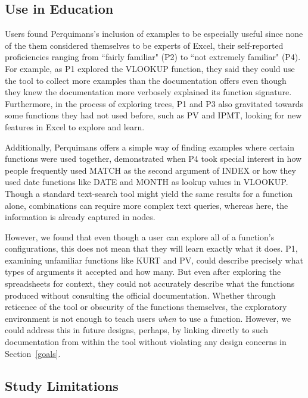 \documentclass[conference]{IEEEtran}
\newcommand{\toolname}{Perquimans\xspace} \newcommand{\toolnameend}{Perquimans}
\begin{document}
	\subsection{Use in Education} Users found \toolname's inclusion of examples to
	be especially useful since none of the them considered themselves to be experts
	of Excel, their self-reported proficiencies ranging from ``fairly familiar"
	(P2) to ``not extremely familiar" (P4). For example, as P1 explored the VLOOKUP
	function, they said they could use the tool to collect more examples than the
	documentation offers even though they knew the documentation more verbosely
	explained its function signature. Furthermore, in the process of exploring
	trees, P1 and P3 also gravitated towards some functions they had not used
	before, such as PV and IPMT, looking for new features in Excel to explore and
	learn. \par
	
	Additionally, \toolname offers a simple way of finding examples where certain
	functions were used together, demonstrated when P4 took special interest in how
	people frequently used MATCH as the second argument of INDEX or how they used
	date functions like DATE and MONTH as lookup values in VLOOKUP. Though a
	standard text-search tool might yield the same results for a function alone,
	combinations can require more complex text queries, whereas here, the
	information is already captured in nodes.  \par
	
	However, we found that even though a user can explore all of a function's
	configurations, this does not mean that they will learn exactly what it does.
	P1, examining unfamiliar functions like KURT and PV, could describe precisely
	what types of arguments it accepted and how many. But even after exploring the
	spreadsheets for context, they could not accurately describe what the functions
	produced without consulting the official documentation. Whether through
	reticence of the tool or obscurity of the functions themselves, the exploratory
	environment is not enough to teach users \textit{when} to use a function.
	However, we could address this in future designs, perhaps, by linking directly
	to such documentation from within the tool without violating any design
	concerns in Section~\ref{goals}. \par
	
	\subsection{Study Limitations} \label{subsec:studylimitations} 
	
\end{document}
